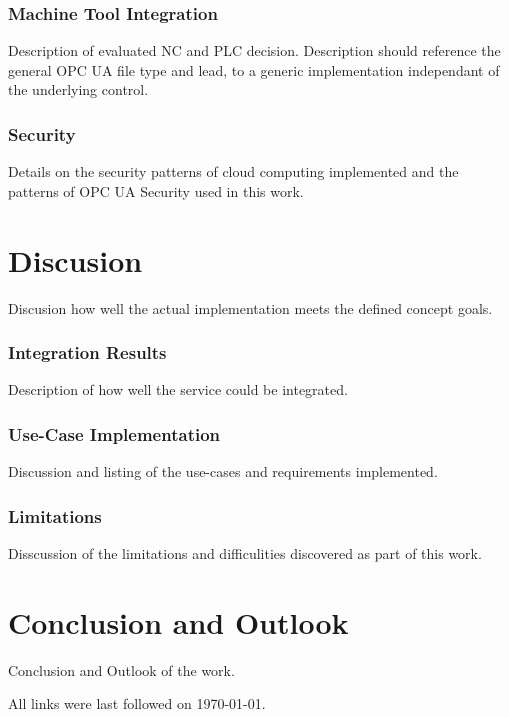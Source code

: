 \documentclass[
a4paper,
twoside,
bibliography=totoc,
headsepline,
cleardoublepage=empty,
parskip=half,
draft=false
]{scrbook}
\begin{document}
			\subsection{Machine Tool Integration} \label{subsec:machine_tool_intergation}
			
				Description of evaluated NC and PLC decision. Description should reference the general OPC UA file type and lead, to a generic implementation independant of the underlying control.
				
			\subsection{Security} \label{subsec:security}
			
				Details on the security patterns of cloud computing implemented and the patterns of OPC UA Security used in this work.
				
	\chapter{Discusion} \label{ch:discusion}
	
		Discusion how well the actual implementation meets the defined concept goals.
		
		\subsection{Integration Results}\label{subsec:integration_results}
		
			Description of how well the service could be integrated.
			
		\subsection{Use-Case Implementation}\label{subsec:use_cases_implementation}
		
			Discussion and listing of the use-cases and requirements implemented.
			
		\subsection{Limitations}\label{subsec:limitations}
		
			Disscussion of the limitations and difficulities discovered as part of this work.
		
	\chapter{Conclusion and Outlook} \label{ch:conclusion_and_outlook}
	
		Conclusion and Outlook of the work.
		
	\clearpage
	
	
	\printbibliography
	
	All links were last followed on \today.
	
	\pagestyle{empty}
	\renewcommand*{\chapterpagestyle}{empty}
	\Versicherung
\end{document}
